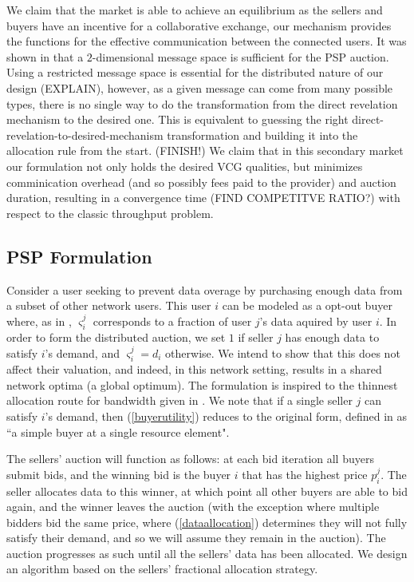\documentclass[12pt]{article}
\theoremstyle{definition}
\newcommand{\vs}{\varsigma}
\begin{document}
\begin{multicols}{2}
We claim that the market is
able to achieve an equilibrium as the sellers and buyers have an
incentive for a collaborative exchange, our mechanism provides the functions
for the effective communication between the connected users. It was shown in
\cite{lazar} that a $2$-dimensional message space is sufficient for the PSP
auction. Using a restricted message space is essential for the distributed
nature of our design (EXPLAIN), however, as a given message can come from many
possible types, there is no single
way to do the transformation from the direct revelation mechanism to the
desired one. This is equivalent to guessing the
right direct-revelation-to-desired-mechanism transformation and building it
into the allocation rule from the start. (FINISH!)
We claim that in
this secondary market our formulation not only holds the desired VCG qualities,
but minimizes comminication overhead (and so possibly fees paid to the provider)
and auction duration, resulting in a convergence time (FIND COMPETITVE RATIO?)
with respect to the classic throughput problem. 


\subsection{PSP Formulation}
Consider a user seeking to prevent
data overage by purchasing enough data from a subset of other network users.
This user $i$ can be modeled as a opt-out buyer where, as in \cite{semret},
$\vs_i^j$ corresponds to a fraction of user $j$'s data aquired by user $i$. In order to form the
distributed auction, we set $1$ if seller $j$ has enough data to
satisfy $i$'s demand, and $\vs_i^j=d_i$ otherwise. We intend to show that this
does not affect their valuation, and indeed, in this network setting, results in a shared network optima (a
global optimum). The formulation is inspired to the thinnest allocation route for
bandwidth given in \cite{lazar}. We note that if a single seller $j$ can
satisfy $i$'s demand, then
(\ref{buyerutility}) reduces to the original form, defined in
\cite{semret} as ``a simple buyer at a single resource element".

The sellers' auction will function as follows: at each bid iteration all buyers
submit bids, and the winning bid is the buyer $i$ that has the highest price
$p_i^j$. The seller allocates
data to this winner, at which point all other buyers are able to bid again, and
the winner leaves the auction (with the exception where multiple bidders bid
the same price, where (\ref{dataallocation}) determines they will not fully
satisfy their demand, and so we will assume they remain in the auction). The auction progresses as such until all the
sellers' data has been allocated. We design an algorithm based on the sellers'
fractional allocation strategy.


\end{multicols}
\end{document}
